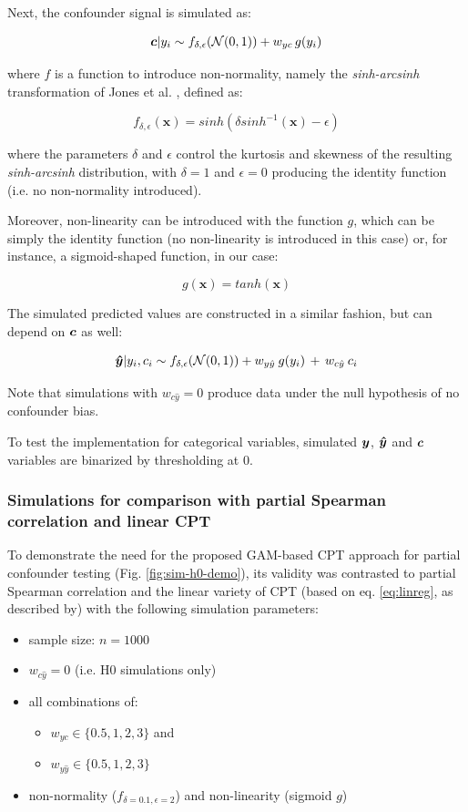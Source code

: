 \documentclass{article}
\begin{document}
Next, the confounder signal is simulated as:

$$ \boldsymbol{c} | y_i \sim f_{\delta, \epsilon}(\mathcal{N}(0, 1)) + w_{yc} \, g(y_i) $$

where $f$ is a function to introduce non-normality, namely the \emph{sinh-arcsinh} transformation of Jones et al. \cite{jones2009sinh}, defined as:

$$f_{\delta, \epsilon}(\boldsymbol{x}) = sinh(\delta sinh^{-1}(\boldsymbol{x}) - \epsilon)$$

where the parameters $\delta$ and $\epsilon$ control the kurtosis and skewness of the resulting \emph{sinh-arcsinh} distribution, with $\delta=1$ and $\epsilon=0$ producing the identity function (i.e. no non-normality introduced).

Moreover, non-linearity can be introduced with the function $g$, which can be simply the identity function (no non-linearity is introduced in this case) or, for instance, a sigmoid-shaped function, in our case:

$$ g(\boldsymbol{x}) = tanh(\boldsymbol{x}) $$


The simulated predicted values are constructed in a similar fashion, but can depend on $\boldsymbol{c}$ as well:

$$ \boldsymbol{\hat{y}} | y_i, c_i \sim f_{\delta, \epsilon}(\mathcal{N}(0, 1)) + w_{y\hat{y}} \: g(y_i) \, + \, w_{c\hat{y}} \: c_i$$

Note that simulations with $w_{c\hat{y}}=0$ produce data under the null hypothesis of no confounder bias.

To test the implementation for categorical variables, simulated $\boldsymbol{y}$, $\boldsymbol{\hat{y}}$ and $\boldsymbol{c}$ variables are binarized by thresholding at 0.

\subsubsection*{Simulations for comparison with partial Spearman correlation and linear CPT}

To demonstrate the need for the proposed GAM-based CPT approach for partial confounder testing (Fig. \ref{fig:sim-h0-demo}), its validity was contrasted to partial Spearman correlation and the linear variety of CPT (based on eq. \ref{eq:linreg}, as described by\cite{berrett2020conditional}) with the following simulation parameters:
\begin{itemize}
    \item sample size: $n = 1000$
    \item $w_{c\hat{y}} = 0$ (i.e. H0 simulations only)
    \item all combinations of:
    \begin{itemize}
        \item $w_{yc} \in \{0.5, 1, 2, 3\}$ and
        \item $w_{y\hat{y}} \in \{0.5, 1, 2, 3\}$
    \end{itemize}
    \item non-normality ($f_{\delta = 0.1, \epsilon = 2}$) and non-linearity (sigmoid $g$)
\end{itemize}
\end{document}
